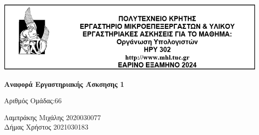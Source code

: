 \begin{center}
    \vspace*{-2cm} %
    \centering
    \hspace*{-0.1cm} %
    \includegraphics[width=1\textwidth]{Images/Lab_Title.png} %
\end{center}

\vspace{1cm}

\centering
{ \large \bfseries Αναφορά Εργαστηριακής Άσκσησης 1} %

\vspace{0.5cm}

Αριθμός Ομάδας:66\\

\raggedright
Λαμπράκης Μιχάλης   \hspace{2em}        2020030077\\
Δήμας Χρήστος       \hspace{3.8em}      2021030183\\

\vspace{1cm}